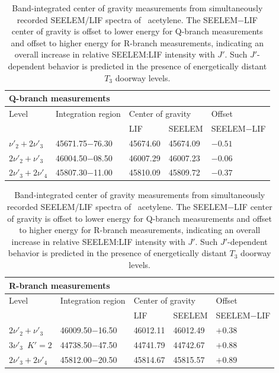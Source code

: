 \documentclass[12pt]{mitthesis}
\begin{document}
\begin{table}[p]
  \caption{Band-integrated center of gravity measurements from
    simultaneously recorded SEELEM/LIF spectra of \astate\ acetylene.
    The SEELEM$-$LIF center of gravity is offset to lower energy for
    Q-branch measurements and offset to higher energy for R-branch measurements, 
    indicating an overall increase in relative SEELEM:LIF intensity
    with $J'$.  Such $J'$-dependent behavior is predicted in the
    presence of energetically distant $T_3$ doorway levels.}
  \label{table:integrated-cog-shifts}

  \centering
        \begin{tabular}{lllll}
        \\[1cm]
        \multicolumn{3}{l}{Q-branch measurements} \\
        \toprule
        Level & Integration region & \multicolumn{2}{l}{Center of gravity} & Offset \\
        \cmidrule{3-5}
        & & LIF & SEELEM & SEELEM$-$LIF \\
        \midrule
        $\nu'_2+2\nu'_3$ & 45671.75$-$76.30 & 45674.60 & 45674.09 & $-0.51$ \\
        $2\nu'_2+\nu'_3$ & 46004.50$-$08.50 & 46007.29 & 46007.23 & $-0.06$ \\
        $2\nu'_3+2\nu'_4$ & 45807.30$-$11.00 & 45810.09 & 45809.72 & $-0.37$ \\
        \bottomrule
        \end{tabular}

        \begin{tabular}{lllll}
        \\[1cm]
        \multicolumn{3}{l}{R-branch measurements} \\
        \toprule
        Level & Integration region & \multicolumn{2}{l}{Center of gravity} & Offset \\
        \cmidrule{3-5}
        & & LIF & SEELEM & SEELEM$-$LIF \\
        \midrule
        $2\nu'_2+\nu'_3$ & 46009.50$-$16.50 & 46012.11 & 46012.49 & $+0.38$ \\
        $3\nu'_3 \:\; K'\!=\!2$ & 44738.50$-$47.50 & 44741.79 & 44742.67 & $+0.88$ \\
        $2\nu'_3+2\nu'_4$ & 45812.00$-$20.50 & 45814.67 & 45815.57 & $+0.89$ \\
        \bottomrule
        \end{tabular}
\end{table}
\end{document}
